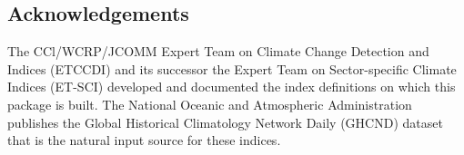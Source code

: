 \subsection*{Acknowledgements}\label{acknowledgements}

The CCl/WCRP/JCOMM Expert Team on Climate Change Detection and Indices
(ETCCDI) and its successor the Expert Team on Sector-specific Climate
Indices (ET-SCI) developed and documented the index definitions on which
this package is built. The National Oceanic and Atmospheric
Administration publishes the Global Historical Climatology Network Daily
(GHCND) dataset that is the natural input source for these indices.



\address{%
Charles Coverdale\\
London, United Kingdom\\%
United Kingdom\\
%
\url{https://github.com/charlescoverdale/climatekit}\\%
%
\href{mailto:charles.f.coverdale@gmail.com}{\nolinkurl{charles.f.coverdale@gmail.com}}%
}
